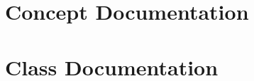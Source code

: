 \documentclass[twoside]{book}
\newcommand{\+}{\discretionary{\mbox{\scriptsize$\hookleftarrow$}}{}{}}
\begin{document}
\chapter{Concept Documentation}

\chapter{Class Documentation}


















\end{document}
